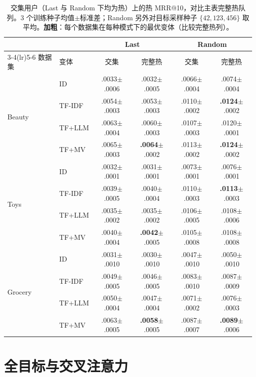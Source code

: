 \documentclass[sigconf,natbib=true,anonymous]{acmart}
\newcommand{\tfidf}{\textsc{TF-IDF}\xspace}
\newcommand{\tfllm}{\textsc{TF+LLM}\xspace}
\newcommand{\tfmv}{\textsc{TF+MV}\xspace}
\begin{document}
\begin{table}[h]
\centering
\caption{交集用户（Last 与 Random 下均为热）上的热 MRR@10，对比主表完整热队列。3 个训练种子均值$\pm$标准差；Random 另外对目标采样种子 $\{42,123,456\}$ 取平均。\textbf{加粗}：每个数据集在每种模式下的最优变体（比较完整热列）。}
\label{tab:intersection}
\small
\setlength{\tabcolsep}{3pt}
\begin{tabular}{@{}llcccc@{}}
\toprule
& & \multicolumn{2}{c}{Last} & \multicolumn{2}{c}{Random} \\
\cmidrule(lr){3-4}\cmidrule(lr){5-6}
数据集 & 变体 & 交集 & 完整热 & 交集 & 完整热 \\
\midrule
\multirow{4}{*}{Beauty}
 & ID     & .0033$\pm$.0006 & .0032$\pm$.0005 & .0066$\pm$.0004 & .0074$\pm$.0004 \\
 & \tfidf & .0054$\pm$.0003 & .0053$\pm$.0003 & .0110$\pm$.0002 & \textbf{.0124}$\pm$.0002 \\
 & \tfllm & .0063$\pm$.0004 & .0060$\pm$.0003 & .0107$\pm$.0003 & .0120$\pm$.0001 \\
 & \tfmv  & .0065$\pm$.0003 & \textbf{.0064}$\pm$.0002 & .0113$\pm$.0002 & \textbf{.0124}$\pm$.0002 \\
\midrule
\multirow{4}{*}{Toys}
 & ID     & .0032$\pm$.0001 & .0031$\pm$.0001 & .0073$\pm$.0001 & .0076$\pm$.0001 \\
 & \tfidf & .0039$\pm$.0005 & .0040$\pm$.0004 & .0110$\pm$.0003 & \textbf{.0113}$\pm$.0003 \\
 & \tfllm & .0035$\pm$.0002 & .0035$\pm$.0002 & .0106$\pm$.0005 & .0108$\pm$.0006 \\
 & \tfmv  & .0040$\pm$.0004 & \textbf{.0042}$\pm$.0005 & .0105$\pm$.0008 & .0108$\pm$.0008 \\
\midrule
\multirow{4}{*}{Grocery}
 & ID     & .0031$\pm$.0010 & .0030$\pm$.0010 & .0047$\pm$.0010 & .0050$\pm$.0010 \\
 & \tfidf & .0049$\pm$.0005 & .0046$\pm$.0005 & .0083$\pm$.0010 & .0087$\pm$.0009 \\
 & \tfllm & .0050$\pm$.0004 & .0047$\pm$.0004 & .0071$\pm$.0002 & .0076$\pm$.0003 \\
 & \tfmv  & .0063$\pm$.0005 & \textbf{.0058}$\pm$.0005 & .0087$\pm$.0007 & \textbf{.0089}$\pm$.0006 \\
\bottomrule
\end{tabular}
\end{table}

\section{全目标与交叉注意力}
\label{app:alltarget}
\end{document}
